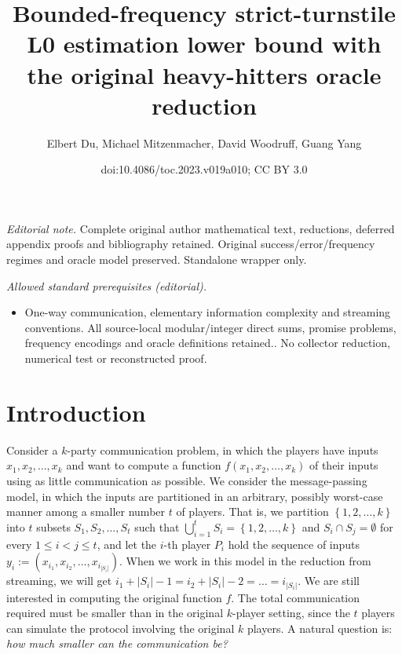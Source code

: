 \documentclass[11pt]{article}
\title{Bounded-frequency strict-turnstile L0 estimation lower bound with the original heavy-hitters oracle reduction}
\author{Elbert Du, Michael Mitzenmacher, David Woodruff, Guang Yang}
\date{doi:10.4086/toc.2023.v019a010; CC BY 3.0}
\numberwithin{equation}{section}
\theoremstyle{definition}
\theoremstyle{plain}
\newcommand{\set}[1]{{\left \{{#1} \right \}}}
\newcommand{\intersect}{\ensuremath{\cap}}
\newcommand{\eqdef}{\ensuremath{:=}}
\begin{document}
\maketitle
\noindent\textit{Editorial note.} Complete original author mathematical text, reductions, deferred appendix proofs and bibliography retained. Original success/error/frequency regimes and oracle model preserved. Standalone wrapper only.\par\medskip
\noindent\textit{Allowed standard prerequisites (editorial).}\begin{itemize}
\item One-way communication, elementary information complexity and streaming conventions. All source-local modular/integer direct sums, promise problems, frequency encodings and oracle definitions retained.. No collector reduction, numerical test or reconstructed proof.
\end{itemize}\medskip
\section{Introduction}
\label{sec:intro}

Consider a $k$-party communication problem, in which the players have inputs $x_1, x_2, \ldots, x_k$ %
 and want to compute a function $f(x_1, x_2, \ldots, x_k)$ of their inputs using as little communication as possible. 
We consider the message-passing model, in which the inputs are partitioned in an arbitrary, possibly worst-case manner among a smaller number $t$ of players. 
That is, we partition $\set{1,2,\dots,k}$ into $t$ subsets $S_1, S_2, \ldots, S_t$ such that %
$\bigcup_{i=1}^t S_i = \set{1,2,\dots,k}$ %
and $S_i\intersect S_j = \emptyset$ for every $1\le i< j\le t$,
and let the $i$-th player $P_i$ hold the sequence of inputs $y_i\eqdef \left(x_{i_1}, x_{i_2}, \ldots, x_{i_{|S_i|}}\right)$. When we work in this model in the reduction from streaming, we will get $i_1 + |S_i|-1 = i_2+|S_i|-2 = \dots = i_{|S_i|}$.
We are still interested in computing the original function $f$.
The total communication required must be smaller than in the original $k$-player setting, since the $t$ players can simulate the protocol involving the original $k$ players. 
A natural question is: \emph{how much smaller can the communication be?}
\end{document}
